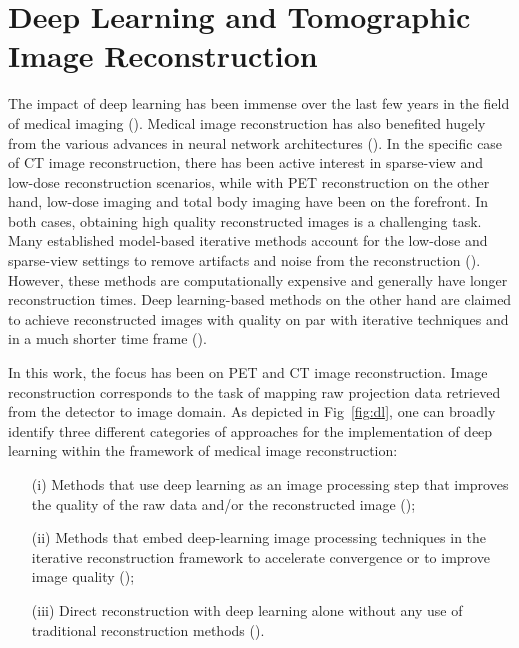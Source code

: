 
\chapter{Deep Learning and Tomographic Image Reconstruction} %

\label{Chapter3} %

The impact of deep learning has been immense over the last few years in the field of medical imaging (\cite{greenspan2016guest,litjens2017survey}). Medical image reconstruction has also benefited hugely from the various advances in neural network architectures (\cite{wang2020deep,reader2020deep,yedder2021deep}). In the specific case of \ac{CT} image reconstruction, there has been active interest in sparse-view and low-dose reconstruction scenarios, while with \ac{PET} reconstruction on the other hand, low-dose imaging and total body imaging have been on the forefront. In both cases, obtaining high quality reconstructed images is a challenging task. Many established model-based iterative methods account for the low-dose and sparse-view settings to remove artifacts and noise from the reconstruction (\cite{nuyts1998iterative,Elbakri2002,liu2013total}). However, these methods are computationally expensive and generally have longer reconstruction times. Deep learning-based methods on the other hand are claimed to achieve reconstructed images with quality on par with iterative techniques and in a much shorter time frame (\cite{leuschner2021quantitative}).

In this work, the focus has been on \ac{PET} and \ac{CT} image reconstruction. 
Image reconstruction corresponds to the task of mapping raw projection data retrieved from the detector to image domain. As depicted in Fig~\ref{fig:dl}, one can broadly identify three different categories of approaches for the implementation of deep learning within the framework of medical image reconstruction:
\begin{itemize}
	\item[(i)] Methods that use deep learning as an image processing step that improves the quality of the raw data and/or the reconstructed image (\cite{gong2018pet, maier2018deep}); 
	\item[(ii)] Methods that embed deep-learning image processing techniques in the iterative reconstruction framework to accelerate convergence or to improve image quality (\cite{xie2019generative,kim2018penalized,gong2019iterative});
	\item[(iii)] Direct reconstruction with deep learning alone without any use of traditional reconstruction methods  (\cite{whiteley2019direct,zhu2018image,haeggstroem2018deeprec}).
\end{itemize}

